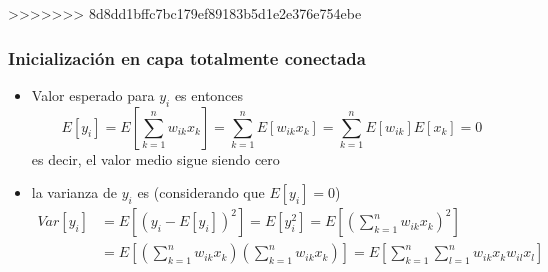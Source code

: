 \documentclass[svgnames,12pt,aspectratio=149]{beamer}
\begin{document}
>>>>>>> 8d8dd1bffc7bc179ef89183b5d1e2e376e754ebe
\begin{frame}
  \frametitle{Inicialización en capa totalmente conectada}
\begin{itemize}
<<<<<<< HEAD
 \item Valor esperado para $y_i$ es entonces
 \begin{equation*}
 E\left[   y_i  \right]= E\left[   \sum_{k=1}^n w_{ik}x_k    \right]=\sum_{k=1}^n E\left[ w_{ik} x_k  \right] =\sum_{k=1}^n E\left[ w_{ik}\right] E\left[ x_k  \right]=0
 \end{equation*}
 es decir, el valor medio sigue siendo cero
 \item la varianza de $y_i$ es (considerando que $E[y_i]=0$)
  \begin{equation*}
  \begin{split}
  Var[y_i]& = E\left[  (y_i-E[y_i])^2   \right] = E [y_i^2]= E\left[ \left(  \sum_{k=1}^n w_{ik} x_k \right)^2  \right]\\
  & = E\left[ \left(  \sum_{k=1}^n w_{ik} x_k \right) \left(  \sum_{k=1}^n w_{ik} x_k \right)  \right]=E\left[\sum_{k=1}^n \sum_{l=1}^n  w_{ik} x_k w_{il} x_l \right] 
  \end{split}
 \end{equation*}

 \end{itemize}
  
\end{frame}
\end{document}
